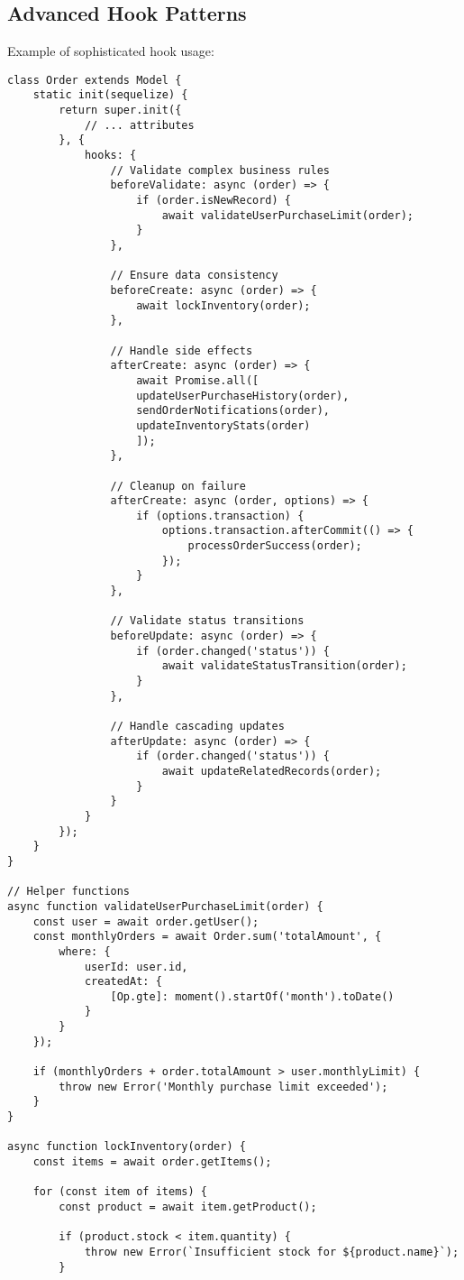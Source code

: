 \documentclass[12pt,a4paper]{book}
\begin{document}
	\subsection{Advanced Hook Patterns}
		Example of sophisticated hook usage:
		
		\begin{verbatim}
class Order extends Model {
	static init(sequelize) {
		return super.init({
			// ... attributes
		}, {
			hooks: {
				// Validate complex business rules
				beforeValidate: async (order) => {
					if (order.isNewRecord) {
						await validateUserPurchaseLimit(order);
					}
				},
				
				// Ensure data consistency
				beforeCreate: async (order) => {
					await lockInventory(order);
				},
				
				// Handle side effects
				afterCreate: async (order) => {
					await Promise.all([
					updateUserPurchaseHistory(order),
					sendOrderNotifications(order),
					updateInventoryStats(order)
					]);
				},
				
				// Cleanup on failure
				afterCreate: async (order, options) => {
					if (options.transaction) {
						options.transaction.afterCommit(() => {
							processOrderSuccess(order);
						});
					}
				},
				
				// Validate status transitions
				beforeUpdate: async (order) => {
					if (order.changed('status')) {
						await validateStatusTransition(order);
					}
				},
				
				// Handle cascading updates
				afterUpdate: async (order) => {
					if (order.changed('status')) {
						await updateRelatedRecords(order);
					}
				}
			}
		});
	}
}

// Helper functions
async function validateUserPurchaseLimit(order) {
	const user = await order.getUser();
	const monthlyOrders = await Order.sum('totalAmount', {
		where: {
			userId: user.id,
			createdAt: {
				[Op.gte]: moment().startOf('month').toDate()
			}
		}
	});
	
	if (monthlyOrders + order.totalAmount > user.monthlyLimit) {
		throw new Error('Monthly purchase limit exceeded');
	}
}

async function lockInventory(order) {
	const items = await order.getItems();
	
	for (const item of items) {
		const product = await item.getProduct();
		
		if (product.stock < item.quantity) {
			throw new Error(`Insufficient stock for ${product.name}`);
		}
		

\end{verbatim}
\end{document}
